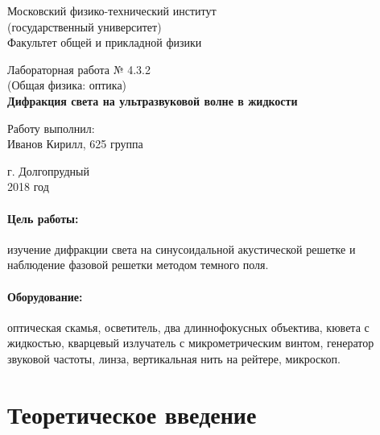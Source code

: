 \documentclass[12pt]{kiarticle}
\begin{document}
	
	\begin{titlepage}
	\begin{center}
		\large 	Московский физико-технический институт \\
		(государственный университет) \\
		Факультет общей и прикладной физики \\
		\vspace{0.2cm}
		
		\vspace{4.5cm}
		Лабораторная работа № 4.3.2 \\ \vspace{0.2cm}
		\large (Общая физика: оптика) \\ \vspace{0.2cm}
		\LARGE \textbf{Дифракция света на ультразвуковой волне в жидкости}
	\end{center}
	\vspace{2.3cm} \large
	
	\begin{center}
		Работу выполнил: \\
		Иванов Кирилл,
		625 группа
		\vspace{10mm}		
		
	\end{center}
	
	\begin{center} \vspace{60mm}
		г. Долгопрудный \\
		2018 год
	\end{center}
\end{titlepage}
	
	\paragraph*{Цель работы:} изучение дифракции света на синусоидальной акустической решетке и
	наблюдение фазовой решетки методом темного поля.
	
	\paragraph*{Оборудование:} оптическая скамья, осветитель, два длиннофокусных объектива, кювета с жидкостью, кварцевый излучатель с микрометрическим винтом, генератор звуковой частоты, линза, вертикальная нить на рейтере, микроскоп.
	
	\section{Теоретическое введение}
	
\end{document}
